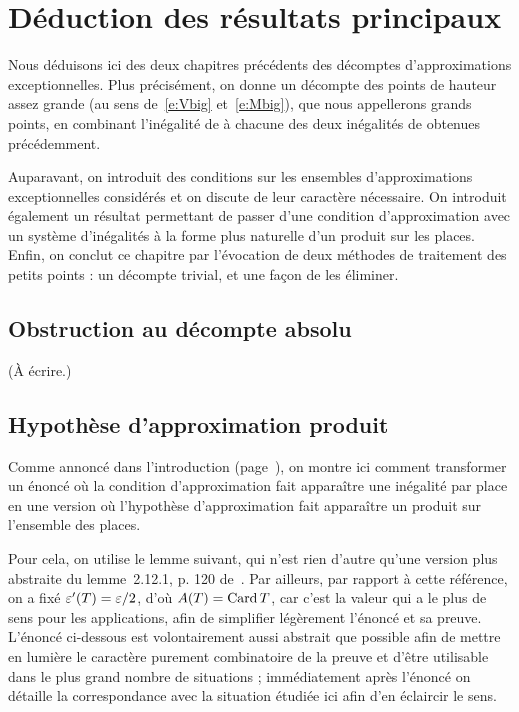 \chapter{Déduction des résultats principaux}
\label{chap:union}

Nous déduisons ici des deux chapitres précédents des décomptes
d'approximations exceptionnelles. Plus précisément, on donne un décompte des
points de hauteur assez grande (au sens de~\eqref{e:Vbig} et~\eqref{e:Mbig}),
que nous appellerons grands points, en combinant l'inégalité de  à
chacune des deux inégalités de  obtenues précédemment.

Auparavant, on introduit des conditions sur les ensembles d'approximations
exceptionnelles considérés et on discute de leur caractère nécessaire. On
introduit également un résultat permettant de passer d'une condition
d'approximation avec un système d'inégalités à la forme plus naturelle d'un
produit sur les places. Enfin, on conclut ce chapitre par l'évocation de deux
méthodes de traitement des petits points : un décompte trivial, et une façon
de les éliminer.


\section{Obstruction au décompte absolu}
\label{sec:obstruction}

\todo (À écrire.)



\section{Hypothèse d'approximation produit}
\label{sec:ha-prod}

Comme annoncé dans l'introduction (page~\pageref{e:ha-prod}), on montre ici
comment transformer un énoncé où la condition d'approximation fait apparaître
une inégalité par place en une version où l'hypothèse d'approximation fait
apparaître un produit sur l'ensemble des places.

Pour cela, on utilise le lemme suivant, qui n'est rien d'autre qu'une version
plus abstraite du lemme~2.12.1, p. 120 de~\cite{farhith}. Par ailleurs, par
rapport à cette référence, on a fixé \( \varepsilon'(T) = \varepsilon/2 \), d'où \( A(T) =
  \operatorname{Card} T \), car c'est la valeur qui a le plus de sens pour les applications,
afin de simplifier légèrement l'énoncé et sa preuve. L'énoncé ci-dessous est
volontairement aussi abstrait que possible afin de mettre en lumière le
caractère purement combinatoire de la preuve et d'être utilisable dans le plus
grand nombre de situations ; immédiatement après l'énoncé on détaille la
correspondance avec la situation étudiée ici afin d'en éclaircir le sens.

